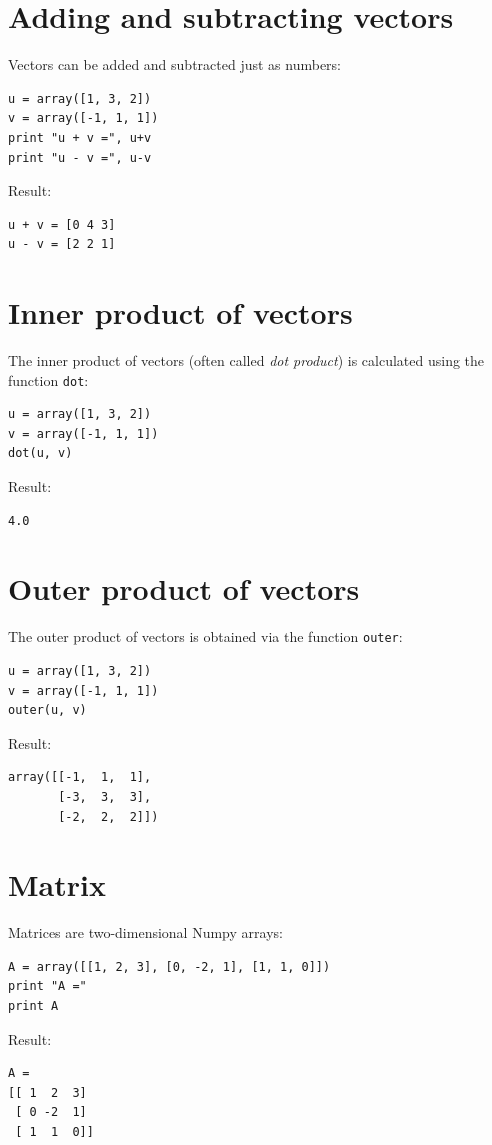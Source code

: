 \documentclass{article}
\begin{document}
\section{Adding and subtracting vectors}

Vectors can be added and subtracted just as numbers:

\begin{verbatim}
u = array([1, 3, 2])
v = array([-1, 1, 1])
print "u + v =", u+v
print "u - v =", u-v
\end{verbatim}
Result:
\begin{verbatim}
u + v = [0 4 3]
u - v = [2 2 1]
\end{verbatim}

\section{Inner product of vectors}

The inner product of vectors (often called {\em dot product}) is calculated
using the function {\tt dot}:

\begin{verbatim}
u = array([1, 3, 2])
v = array([-1, 1, 1])
dot(u, v)
\end{verbatim}
Result:
\begin{verbatim}
4.0
\end{verbatim}

\section{Outer product of vectors}

The outer product of vectors is obtained via the function {\tt outer}:
\begin{verbatim}
u = array([1, 3, 2])
v = array([-1, 1, 1])
outer(u, v)
\end{verbatim}
Result:
\begin{verbatim}
array([[-1,  1,  1],
       [-3,  3,  3],
       [-2,  2,  2]])
\end{verbatim}

\section{Matrix}

Matrices are two-dimensional Numpy arrays:
\begin{verbatim}
A = array([[1, 2, 3], [0, -2, 1], [1, 1, 0]])
print "A ="
print A
\end{verbatim}
Result:
\begin{verbatim}
A =
[[ 1  2  3]
 [ 0 -2  1]
 [ 1  1  0]]
\end{verbatim}
\end{document}
